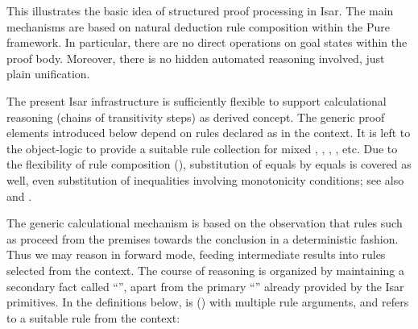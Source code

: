 \begin{isabellebody}
\begin{isamarkuptext}
  \medskip This illustrates the basic idea of structured proof
  processing in Isar.  The main mechanisms are based on natural
  deduction rule composition within the Pure framework.  In
  particular, there are no direct operations on goal states within the
  proof body.  Moreover, there is no hidden automated reasoning
  involved, just plain unification.%
\end{isamarkuptext}%
\isamarkuptrue%
%
\isamarkuptrue%
%
\begin{isamarkuptext}%
The present Isar infrastructure is sufficiently flexible to support
  calculational reasoning (chains of transitivity steps) as derived
  concept.  The generic proof elements introduced below depend on
  rules declared as  in the context.  It is left to
  the object-logic to provide a suitable rule collection for mixed
  \isa{{\isachardoublequote}{\isacharequal}{\isachardoublequote}}, \isa{{\isachardoublequote}{\isacharless}{\isachardoublequote}}, \isa{{\isachardoublequote}{\isasymle}{\isachardoublequote}}, \isa{{\isachardoublequote}{\isasymsubset}{\isachardoublequote}}, \isa{{\isachardoublequote}{\isasymsubseteq}{\isachardoublequote}} etc.
  Due to the flexibility of rule composition
  (), substitution of equals by
  equals is covered as well, even substitution of inequalities
  involving monotonicity conditions; see also \cite[\S6]{Wenzel-PhD}
  and \cite{Bauer-Wenzel:2001}.

  The generic calculational mechanism is based on the observation that
  rules such as  proceed from the
  premises towards the conclusion in a deterministic fashion.  Thus we
  may reason in forward mode, feeding intermediate results into rules
  selected from the context.  The course of reasoning is organized by
  maintaining a secondary fact called ``\hyperlink{fact.calculation}{\mbox{}}'', apart
  from the primary ``\hyperlink{fact.this}{\mbox{}}'' already provided by the Isar
  primitives.  In the definitions below, \hyperlink{attribute.OF}{\mbox{}} is
  \hyperlink{inference.resolution}{\mbox{}} () with
  multiple rule arguments, and  refers to a suitable
  rule from the context:


\end{isamarkuptext}
\end{isabellebody}
